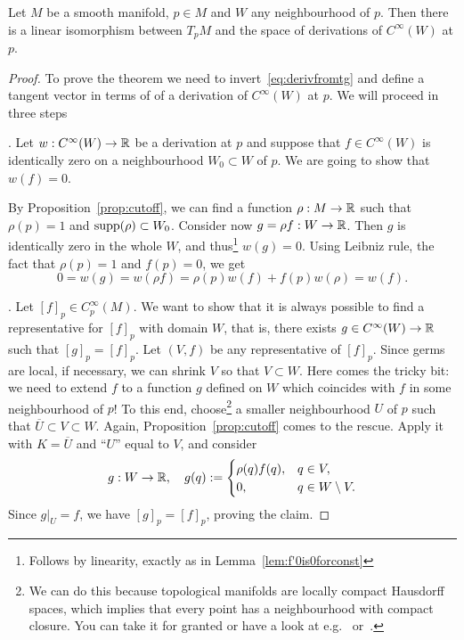 \begin{proposition}
  Let $M$ be a smooth manifold, $p\in M$ and $W$ any neighbourhood of $p$.
  Then there is a linear isomorphism between $T_p M$ and the space of derivations of $C^\infty(W)$ at $p$.
\end{proposition}
\begin{proof}
  To prove the theorem we need to invert~\eqref{eq:derivfromtg} and define a tangent vector in terms of of a derivation of $C^\infty(W)$ at $p$.
  We will proceed in three steps

  . Let $w:C^\infty(W) \to\mathbb{R}$ be a derivation at $p$ and suppose that $f\in C^\infty(W)$ is identically zero on a neighbourhood $W_0\subset W$ of $p$. We are going to show that $w(f)=0$.

  By Proposition~\ref{prop:cutoff}, we can find a function $\rho:M\to\mathbb{R}$ such that $\rho(p)=1$ and $\operatorname{supp}(\rho) \subset W_0$. Consider now $g = \rho f : W \to \mathbb{R}$. Then $g$ is identically zero in the whole $W$, and thus\footnote{Follows by linearity, exactly as in Lemma~\ref{lem:f'0is0forconst}} $w(g) = 0$. Using Leibniz rule, the fact that $\rho(p)=1$ and $f(p) = 0$, we get
  \begin{equation}
    0 = w(g) = w(\rho f) = \rho(p) w(f) + f(p)w(\rho) = w(f).
  \end{equation}

  .
  Let $[f]_p\in C_p^\infty(M)$.
  We want to show that it is always possible to find a representative for $[f]_p$ with domain $W$, that is, there exists $g\in C^\infty(W)\to\mathbb{R}$ such that $[g]_p = [f]_p$.
  Let $(V, f)$ be any representative of $[f]_p$.
  Since germs are local, if necessary, we can shrink $V$ so that $V\subset W$.
  Here comes the tricky bit: we need to extend $f$ to a function $g$ defined on $W$ which coincides with $f$ in some neighbourhood of $p$!
  To this end, choose\footnote{We can do this because topological manifolds are locally compact Hausdorff spaces, which implies that every point has a neighbourhood with compact closure. You can take it for granted or have a look at e.g.~\cite[Lemma 4.65]{book:lee:topology} or~\cite{book:munkres:topology}.} a smaller neighbourhood $U$ of $p$ such that $\overline{U}\subset V\subset W$.
  Again, Proposition~\ref{prop:cutoff} comes to the rescue. Apply it with $K=\overline{U}$ and ``$U$'' equal to $V$, and consider
  \begin{equation}
    g:W\to\mathbb{R}, \quad
    g(q) := \begin{cases}
      \rho(q)f(q), & q\in V,\\
      0, & q \in W\setminus V.
    \end{cases}
  \end{equation}
  Since $g|_U = f$, we have $[g]_p = [f]_p$, proving the claim.


\end{proof}
